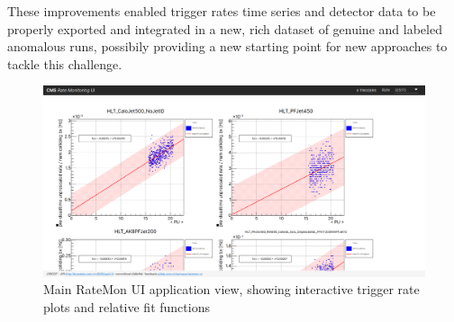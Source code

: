 \documentclass[a4, oneside, 11pt, nobib]{memoir}
\begin{document}
		These improvements enabled trigger rates time series and detector data to be properly exported and integrated in a new, rich dataset of genuine and labeled anomalous runs, possibily providing a new starting point for new approaches to tackle this challenge.

\begin{figure}[H]
    \centerline{
        \includegraphics[width=0.9\paperwidth]{figures/ratemon-ui0.png}}
    \caption{Main RateMon UI application view, showing interactive trigger rate plots and relative fit functions}
    \label{fig:ratemon_ui0}
\end{figure}
 
\printbibliography
\thispagestyle{empty}
\end{document}
